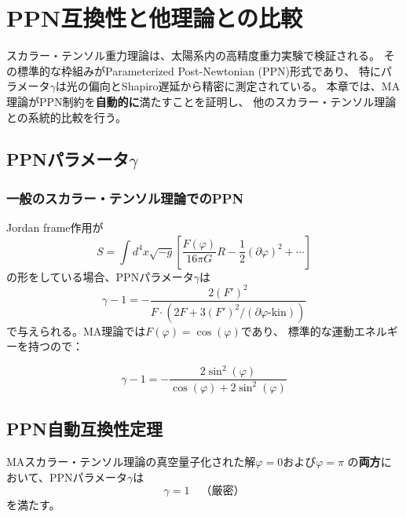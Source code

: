 
\chapter{PPN互換性と他理論との比較}
\label{ch:ppn-comparison}

スカラー・テンソル重力理論は、太陽系内の高精度重力実験で検証される。
その標準的な枠組みがParameterized Post-Newtonian (PPN)形式であり、
特にパラメータ$\gamma$は光の偏向とShapiro遅延から精密に測定されている。
本章では、MA理論がPPN制約を\textbf{自動的に}満たすことを証明し、
他のスカラー・テンソル理論との系統的比較を行う。

\section{PPNパラメータ$\gamma$}
\label{sec:10.1}

\subsection{一般のスカラー・テンソル理論でのPPN}

Jordan frame作用が
\[
S = \int d^4x\sqrt{-g}\left[\frac{F(\varphi)}{16\pi G}R
  - \frac{1}{2}(\partial\varphi)^2 + \cdots\right]
\]
の形をしている場合、PPNパラメータ$\gamma$は
\begin{equation}
\gamma - 1 = -\frac{2(F')^2}{F \cdot (2F + 3(F')^2 / (\partial\varphi \text{-kin}))}
\end{equation}
で与えられる。MA理論では$F(\varphi) = \cos(\varphi)$であり、
標準的な運動エネルギーを持つので：

\begin{keyresult}[MA理論のPPNパラメータ]
\begin{equation}
\gamma - 1 = -\frac{2\sin^2(\varphi)}{\cos(\varphi) + 2\sin^2(\varphi)}
\label{eq:ppn-gamma}
\end{equation}
\end{keyresult}

\section{PPN自動互換性定理}
\label{sec:10.2}

\begin{keyresult}[PPN自動互換性]
\begin{theorem}[PPN自動互換性]
\label{thm:ppn-auto}
MAスカラー・テンソル理論の真空量子化された解$\varphi = 0$および$\varphi = \pi$
の\textbf{両方}において、PPNパラメータ$\gamma$は
\[
\boxed{\gamma = 1 \quad\text{（厳密）}}
\]
を満たす。
\end{theorem}
\end{keyresult}

